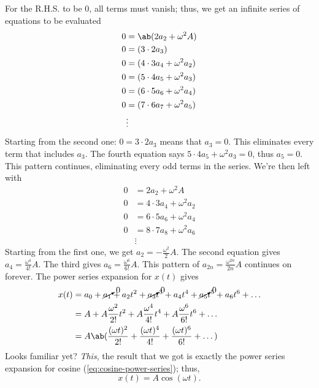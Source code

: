 For the R.H.S. to be $0$, all terms must vanish; thus, we get an infinite series of equations to be evaluated
\begin{equation}
	\begin{aligned}
		0 &= \ab(2a_2 + \omega^2A) \\
		0 &= (3 \cdot 2a_3) \\
		0 &= (4\cdot 3a_4 + \omega^2a_2) \\
		0 &= (5\cdot 4a_5 + \omega^2a_3) \\
		0 &= (6\cdot 5a_6 + \omega^2a_4) \\
		0 &= (7\cdot 6a_7 + \omega^2a_5) \\
		  &\vdots
	\end{aligned}
\end{equation}
Starting from the second one: $0 = 3 \cdot 2a_3$ means that $a_3 = 0$. This eliminates every term that includes $a_3$. The fourth equation says $5\cdot 4a_5 + \omega^2a_3 = 0$, thus $a_5 = 0$. This pattern continues, eliminating every odd terms in the series. We're then left with
\begin{equation}
	\begin{aligned}
		0 &= 2a_2 + \omega^2A \\
		0 &= 4\cdot 3a_4 + \omega^2a_2 \\
		0 &= 6\cdot 5a_6 + \omega^2a_4 \\
		0 &= 8\cdot 7a_8 + \omega^2a_6 \\
		  &\vdots
	\end{aligned}
\end{equation}
Starting from the first one, we get $a_2 = -\frac{\omega^2}{2}A$. The second equation gives $a_4 = \frac{\omega^4}{4!}A$. The third gives $a_6 = \frac{\omega^6}{6!}A$. This pattern of $a_{2n} = \frac{\omega^{2n}}{2n}A$ continues on forever. The power series expansion for $x(t)$ gives
\begin{align}
	x(t) &= a_0 + \cancelto{0}{a_1} + a_2t^2 + \cancelto{0}{a_3}t^3 + a_4t^4 + \cancelto{0}{a_5}t^5 + a_6t^6 + \dots \\
		 &= A + A\frac{\omega^{2}}{2!}t^2 + A\frac{\omega^{4}}{4!}t^4 + A\frac{\omega^{6}}{6!}t^6 + \dots \\
		 &= A\ab(\frac{(\omega t)^2}{2!} + \frac{(\omega t)^4}{4!} + \frac{(\omega t)^6}{6!} + \dots)
\end{align}
Looks familiar yet? \emph{This}, the result that we got is exactly the power series expansion for cosine (\cref{eq:cosine-power-series}); thus,
\begin{equation}
	x(t) = A\cos(\omega t).
\end{equation}

